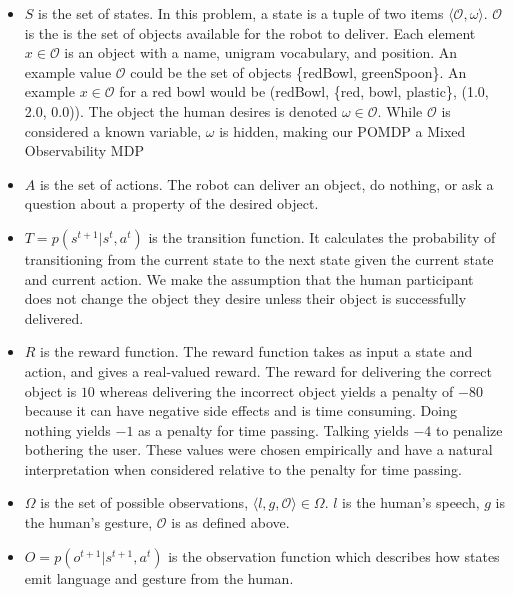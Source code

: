 \documentclass[letterpaper]{article}
\newcommand{\stnote}[1]{\textcolor{blue}{\textbf{ST: #1}}}
\begin{document}

\begin{itemize}

	\item $S$ is the set of states. In this problem, a state is a tuple of two items $\langle \mathcal{O}, \omega \rangle$. $\mathcal{O}$ is the is the set of objects available for the robot to deliver. Each element $x \in \mathcal{O}$ is an object with a name, unigram vocabulary, and position. An example value $\mathcal{O}$ could be the set of objects \{redBowl, greenSpoon\}.  An example $x \in \mathcal{O}$  for a red bowl would be (redBowl, \{red, bowl, plastic\}, (1.0, 2.0, 0.0)). The object the human desires is denoted $\omega \in \mathcal{O}$. While $\mathcal{O}$ is considered a known variable, $\omega$ is hidden, making our POMDP a Mixed Observability MDP~\cite{momdp}
	\item $A$ is the set of actions. The robot can deliver an object, do nothing, or ask a question about a property of the desired object. 
	\item $T = p(s^{t+1}|s^{t},a^{t})$ is the transition function. It calculates the probability of transitioning from the current state to the next state given the current state and current action. We make the assumption that the human participant does not change the object they desire unless their object is successfully delivered. 

	\item $R$ is the reward function. The reward function  takes as input a state and action, and gives a real-valued reward. 
		The reward for delivering the correct object is $10$ whereas delivering the incorrect object yields a penalty of $-80$ because it can have negative side effects and is time consuming. Doing nothing yields $-1$ as a penalty for time passing. Talking yields $-4$ to penalize bothering the user. These values were chosen empirically and have a natural interpretation when considered relative to the penalty for time passing. 
		
  \item $\Omega$ is the set of possible observations, $\langle l, g,\mathcal{O}\rangle \in \Omega$.  $l$ is the human's speech, $g$ is the human's gesture, $\mathcal{O}$ is as defined above.  
  \item $O = p(o^{t+1}|s^{t+1},a^t)$ is the observation function which describes how states emit language and gesture from the human. 
  

\end{itemize}
\end{document}
